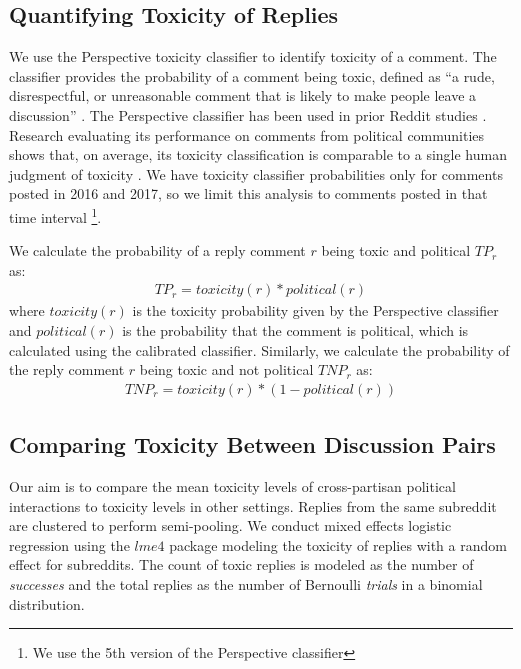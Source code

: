\documentclass[letterpaper]{article} %
\begin{document}
\subsection{Quantifying Toxicity of Replies}

We use the Perspective toxicity classifier to identify toxicity of a comment. The classifier provides the probability of a comment being toxic, defined as ``a rude, disrespectful, or unreasonable comment that is likely to make people leave a discussion'' \cite{wulczyn2017ex}. The Perspective classifier has been used in prior Reddit studies \cite{mittos2020analyzing,xia2020exploring}. Research evaluating its performance on comments from political communities shows that, on average, its toxicity classification is comparable to a single human judgment of toxicity \cite{rajadesingan2020quick}. We have toxicity classifier probabilities only for comments posted in 2016 and 2017, so we limit this analysis to comments posted in that time interval \footnote{We use the 5th version of the Perspective classifier}.  

We calculate the probability of a reply comment $r$ being toxic and political $TP_r$ as:
\begin{align*}
TP_{r} = toxicity(r) * political(r)
\end{align*}
where $toxicity(r)$ is the toxicity probability given by the Perspective classifier and $political(r)$ is the probability that the comment is political, which is calculated using the calibrated classifier. Similarly, we calculate the probability of the reply comment $r$ being toxic and not political $TNP_r$ as:
\begin{align*}
TNP_r = toxicity(r) *(1-political(r))
\end{align*}


\subsection{Comparing Toxicity Between Discussion Pairs}

Our aim is to compare the mean toxicity levels of cross-partisan political interactions to toxicity levels in other settings. Replies from the same subreddit are clustered to perform semi-pooling. We conduct mixed effects logistic regression using the $lme4$ package \cite{bates2014fitting} modeling the toxicity of replies with a random effect for subreddits. The count of toxic replies is modeled as the number of \textit{successes} and the total replies as the number of Bernoulli \textit{trials} in a binomial distribution.
\end{document}
